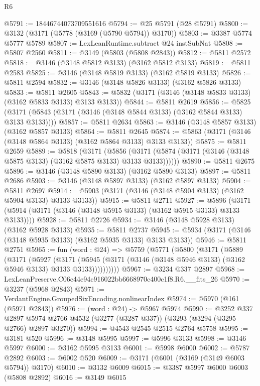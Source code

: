 \begin{lexlean}{R6}
\begin{coremodule}
@5791 := 18446744073709551616
@5794 := @25 @5791 (@28 @5791)
@5800 := @3132 (@3171 (@5778 (@3169 (@5790 @5794)) @3170))
@5803 := @3387 @5774 @5777 @5789
@5807 := LexLeanRuntime.subtract @24 instSubNat
@5808 := @5807 @2560
@5811 := @3149 (@5803 (@5808 @2843))
@5812 := @5811 @2572
@5818 := @3146 (@3148 @5812 @3133) (@3162 @5812 @3133)
@5819 := @5811 @2583
@5825 := @3146 (@3148 @5819 @3133) (@3162 @5819 @3133)
@5826 := @5811 @2594
@5832 := @3146 (@3148 @5826 @3133) (@3162 @5826 @3133)
@5833 := @5811 @2605
@5843 := @5832 (@3171 (@3146 (@3148 @5833 @3133) (@3162 @5833 @3133) @3133 @3133))
@5844 := @5811 @2619
@5856 := @5825 (@3171 (@5843 (@3171 (@3146 (@3148 @5844 @3133) (@3162 @5844 @3133) @3133 @3133))))
@5857 := @5811 @2634
@5863 := @3146 (@3148 @5857 @3133) (@3162 @5857 @3133)
@5864 := @5811 @2645
@5874 := @5863 (@3171 (@3146 (@3148 @5864 @3133) (@3162 @5864 @3133) @3133 @3133))
@5875 := @5811 @2659
@5889 := @5818
    (@3171
      (@5856 (@3171 (@5874 (@3171 (@3146 (@3148 @5875 @3133) (@3162 @5875 @3133) @3133 @3133))))))
@5890 := @5811 @2675
@5896 := @3146 (@3148 @5890 @3133) (@3162 @5890 @3133)
@5897 := @5811 @2686
@5903 := @3146 (@3148 @5897 @3133) (@3162 @5897 @3133)
@5904 := @5811 @2697
@5914 := @5903 (@3171 (@3146 (@3148 @5904 @3133) (@3162 @5904 @3133) @3133 @3133))
@5915 := @5811 @2711
@5927 := @5896 (@3171 (@5914 (@3171 (@3146 (@3148 @5915 @3133) (@3162 @5915 @3133) @3133 @3133))))
@5928 := @5811 @2726
@5934 := @3146 (@3148 @5928 @3133) (@3162 @5928 @3133)
@5935 := @5811 @2737
@5945 := @5934 (@3171 (@3146 (@3148 @5935 @3133) (@3162 @5935 @3133) @3133 @3133))
@5946 := @5811 @2751
@5965 := fun (word : @24) =>
  @5759
    (@5771
      (@5800
        (@3171
          (@5889
            (@3171
              (@5927
                (@3171
                  (@5945 (@3171 (@3146 (@3148 @5946 @3133) (@3162 @5946 @3133) @3133 @3133))))))))))
@5967 := @3234 @337 @2897
@5968 := LexLeanPreserve.C06c44e94c916022bb6668970c400c1f8.R6.__fits_26
@5970 := @3237 (@5968 @2843)
@5971 := VerdantEngine.GroupedSixEncoding.nonlinearIndex
@5974 := @5970 (@161 (@5971 @2843))
@5976 := (word : @24) -> @5967 @5974
@5990 := @3252
    @337
    @2897
    @5974
    @2766
    @4532
    (@3277 (@3287 @337))
    (@3293 (@3294 (@3295 @2766) @2897 @3270))
@5994 := @4543 @2545 @2515 @2764 @5758
@5995 := @3181 @520
@5996 := @3148 @5995
@5997 := @5996 @3133
@5998 := @3146 @5997
@6000 := @3162 @5995 @3133
@6001 := @5998 @6000
@6002 := @5787 @2892
@6003 := @6002 @520
@6009 := @3171 (@6001 (@3169 (@3149 @6003 @5794)) @3170)
@6010 := @3132 @6009
@6015 := @3387 @5997 @6000 @6003 (@5808 @2892)
@6016 := @3149 @6015

\end{coremodule}
\end{lexlean}
